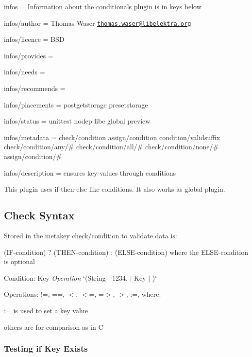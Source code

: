 
\begin{DoxyItemize}
\item infos = Information about the conditionals plugin is in keys below
\item infos/author = Thomas Waser \href{mailto:thomas.waser@libelektra.org}{\tt thomas.\+waser@libelektra.\+org}
\item infos/licence = B\+SD
\item infos/provides =
\item infos/needs =
\item infos/recommends =
\item infos/placements = postgetstorage presetstorage
\item infos/status = unittest nodep libc global preview
\item infos/metadata = check/condition assign/condition condition/validsuffix check/condition/any/\# check/condition/all/\# check/condition/none/\# assign/condition/\#
\item infos/description = ensures key values through conditions
\end{DoxyItemize}

This plugin uses if-\/then-\/else like conditions. It also works as global plugin.

\subsection*{Check Syntax}

Stored in the metakey {\ttfamily check/condition} to validate data is\+:

{\ttfamily (I\+F-\/condition) ? (T\+H\+E\+N-\/condition) \+: (E\+L\+S\+E-\/condition)} where the E\+L\+S\+E-\/condition is optional

Condition\+: {\ttfamily Key} {\itshape Operation} `(\textquotesingle{}String\textquotesingle{} $\vert$ \textquotesingle{}1234.\textquotesingle{} $\vert$ Key $\vert$ \textquotesingle{}\textquotesingle{})`

Operations\+: {\ttfamily !=, ==, $<$, $<$=, =$>$, $>$, \+:=}, where\+:


\begin{DoxyItemize}
\item {\ttfamily \+:=} is used to set a key value
\item others are for comparison as in C
\end{DoxyItemize}

\subsubsection*{Testing if Key Exists}

